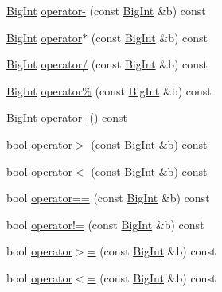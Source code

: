 \begin{DoxyCompactItemize}
\item 
\hyperlink{class_big_int}{Big\+Int} \hyperlink{class_big_int_a64ef59813d4221635ae33f8de10f88cb}{operator-\/} (const \hyperlink{class_big_int}{Big\+Int} \&b) const 
\item 
\hyperlink{class_big_int}{Big\+Int} \hyperlink{class_big_int_aa4e3204ae4a0c81e8e33d0a848078a8d}{operator$\ast$} (const \hyperlink{class_big_int}{Big\+Int} \&b) const 
\item 
\hyperlink{class_big_int}{Big\+Int} \hyperlink{class_big_int_ab5679019b8821c01b161147495e21a4e}{operator/} (const \hyperlink{class_big_int}{Big\+Int} \&b) const 
\item 
\hyperlink{class_big_int}{Big\+Int} \hyperlink{class_big_int_ae9bbf1128217cb469123350f92e4c62f}{operator\%} (const \hyperlink{class_big_int}{Big\+Int} \&b) const 
\item 
\hyperlink{class_big_int}{Big\+Int} \hyperlink{class_big_int_a56350bc8395ed38c2afdbb4554e56b1f}{operator-\/} () const 
\item 
bool \hyperlink{class_big_int_a4631ce319f6617a43a4dc89127953ebb}{operator$>$} (const \hyperlink{class_big_int}{Big\+Int} \&b) const 
\item 
bool \hyperlink{class_big_int_a56b4522f02907f0d719809a0e81c525e}{operator$<$} (const \hyperlink{class_big_int}{Big\+Int} \&b) const 
\item 
bool \hyperlink{class_big_int_a057d936831e7a103a1830366c990602f}{operator==} (const \hyperlink{class_big_int}{Big\+Int} \&b) const 
\item 
bool \hyperlink{class_big_int_ad6a59ed7dedbe35433c1a83ca751fe88}{operator!=} (const \hyperlink{class_big_int}{Big\+Int} \&b) const 
\item 
bool \hyperlink{class_big_int_ae5bdb87103df4be652062b015a1fa653}{operator$>$=} (const \hyperlink{class_big_int}{Big\+Int} \&b) const 
\item 
bool \hyperlink{class_big_int_ada9b7b9e96bb3aad13c48637397b6f31}{operator$<$=} (const \hyperlink{class_big_int}{Big\+Int} \&b) const 
\end{DoxyCompactItemize}
